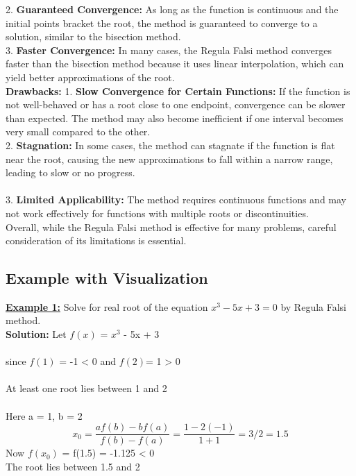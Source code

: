 \documentclass[12pt,a4paper]{article}
\begin{document}
	2. \textbf{Guaranteed Convergence:} As long as the function is continuous and the initial points bracket the root, the method is guaranteed to converge to a solution, similar to the bisection method. \\ 
	
	3. \textbf{Faster Convergence:} In many cases, the Regula Falsi method converges faster than the bisection method because it uses linear interpolation, which can yield better approximations of the root.\\
	
	\textbf{Drawbacks:} \vspace{0.5cm}
	1. \textbf{Slow Convergence for Certain Functions:} If the function is not well-behaved or has a root close to one endpoint, convergence can be slower than expected. The method may also become inefficient if one interval becomes very small compared to the other.\\
	
	2. \textbf{Stagnation:} In some cases, the method can stagnate if the function is flat near the root, causing the new approximations to fall within a narrow range, leading to slow or no progress.\\ \\
	3. \textbf{Limited Applicability:} The method requires continuous functions and may not work effectively for functions with multiple roots or discontinuities. \\
	
	Overall, while the Regula Falsi method is effective for many problems, careful consideration of its limitations is essential.
	\subsection{Example with Visualization}
		\textbf{\underline{Example 1:}} Solve for real root of the equation $x^3 - 5x + 3 = 0$ by Regula Falsi method. \\
		
		\textbf{Solution:} Let \(f(x)\) = $x^3$ - 5x + 3 \\ \\
		since \(f(1)\) = -1 < 0 and \(f(2)\)= 1 > 0 \\ \\
		At least one root lies between 1 and 2 \\ \\
		Here a = 1, b = 2
		\[
		x_0 = \frac{af(b)-bf(a)}{f(b)-f(a)} = \frac{1 - 2(-1)}{1+1} = 3/2 =1.5
		\]
		Now \(f(x_0)\) = f(1.5) = -1.125 < 0 \\
		The root lies between 1.5 and 2
		
\end{document}
